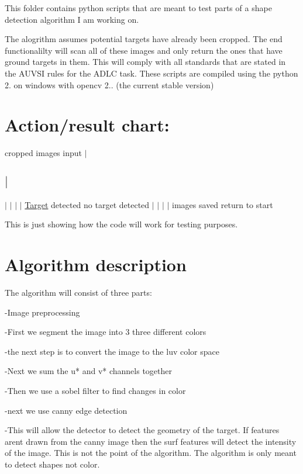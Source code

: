 This folder contains python scripts that are meant to test parts of a shape detection algorithm I am working on.

The alogrithm assumes potential targets have already been cropped. The end functionalilty will scan all of these images and only return the ones that have ground targets in them. This will comply with all standards that are stated in the A\-U\-V\-S\-I rules for the A\-D\-L\-C task. These scripts are compiled using the python 2. on windows with opencv 2.. (the current stable version)

\section*{Action/result chart\-: }

cropped images input $\vert$ \subsection*{$\vert$ }

$\vert$ $\vert$ $\vert$ $\vert$ \hyperlink{structTarget}{Target} detected no target detected $\vert$ $\vert$ $\vert$ $\vert$ images saved return to start

This is just showing how the code will work for testing purposes.

\section*{Algorithm description }

The algorithm will consist of three parts\-:

-\/\-Image preprocessing \begin{DoxyVerb}            -First we segment the image into 3 three different colors

            -the next step is to convert the image to the luv color space

            -Next we sum the u* and  v* channels together

            -Then we use a sobel filter to find changes in color

            -next we use canny edge detection

              -This will allow the detector to detect the geometry of the target. If features arent drawn from the canny image then
              the surf features will detect the intensity of the image. This is not the point of the algorithm. The algorithm is only 
              meant to detect shapes not color.
\end{DoxyVerb}


